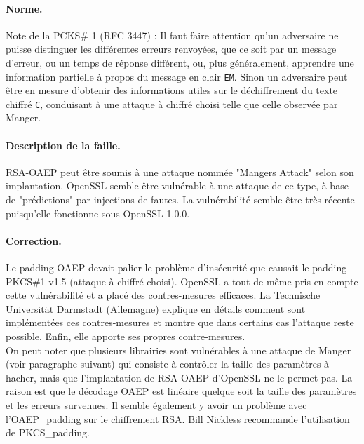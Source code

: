 \paragraph{Norme.\\}
Note de la PCKS\# 1 (RFC 3447) : Il faut faire attention qu'un adversaire ne puisse distinguer les différentes erreurs renvoyées, que ce soit par un message d'erreur, ou un temps de réponse différent, ou, plus généralement, apprendre une information partielle à propos du message en clair \texttt{EM}. Sinon un adversaire peut être en mesure d'obtenir des informations utiles sur le déchiffrement du texte chiffré \texttt{C}, conduisant à une attaque à chiffré choisi telle que celle observée par Manger.

\paragraph{Description de la faille.\\}
RSA-OAEP peut être soumis à une attaque nommée "Mangers Attack" selon son implantation. OpenSSL semble être vulnérable à une attaque de ce type, à base de "prédictions" par injections de fautes. La vulnérabilité semble être très récente puisqu'elle fonctionne sous OpenSSL 1.0.0.\\

\paragraph{Correction.\\}
Le padding OAEP devait palier le problème d'insécurité que causait le padding PKCS\#1 v1.5 (attaque à chiffré choisi). OpenSSL a tout de même pris en compte cette vulnérabilité et a placé des contres-mesures efficaces. La Technische Universität Darmstadt (Allemagne) explique en détails comment sont implémentées ces contres-mesures et montre que dans certains cas l'attaque reste possible. Enfin, elle apporte ses propres contre-mesures.\\

On peut noter que plusieurs librairies sont vulnérables à une attaque de Manger (voir paragraphe suivant) qui consiste à contrôler la taille des paramètres à hacher, mais que l'implantation de RSA-OAEP d'OpenSSL ne le permet pas. La raison est que le décodage OAEP est linéaire quelque soit la taille des paramètres et les erreurs survenues. Il semble également y avoir un problème avec l'OAEP\_padding sur le chiffrement RSA. Bill Nickless recommande l'utilisation de PKCS\_padding.\\

